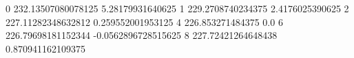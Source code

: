 0 232.13507080078125 5.28179931640625
1 229.2708740234375 2.4176025390625
2 227.11282348632812 0.259552001953125
4 226.853271484375 0.0
6 226.79698181152344 -0.0562896728515625
8 227.72421264648438 0.870941162109375
